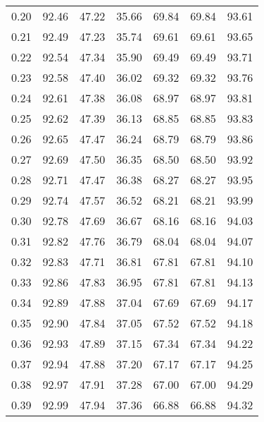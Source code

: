 \begin{tabular}{|c|c|c|c|c|c|c|}
      0.20 &     92.46 &     47.22 &      35.66 &   69.84 &      69.84 &         93.61 \\
      0.21 &     92.49 &     47.23 &      35.74 &   69.61 &      69.61 &         93.65 \\
      0.22 &     92.54 &     47.34 &      35.90 &   69.49 &      69.49 &         93.71 \\
      0.23 &     92.58 &     47.40 &      36.02 &   69.32 &      69.32 &         93.76 \\
      0.24 &     92.61 &     47.38 &      36.08 &   68.97 &      68.97 &         93.81 \\
      0.25 &     92.62 &     47.39 &      36.13 &   68.85 &      68.85 &         93.83 \\
      0.26 &     92.65 &     47.47 &      36.24 &   68.79 &      68.79 &         93.86 \\
      0.27 &     92.69 &     47.50 &      36.35 &   68.50 &      68.50 &         93.92 \\
      0.28 &     92.71 &     47.47 &      36.38 &   68.27 &      68.27 &         93.95 \\
      0.29 &     92.74 &     47.57 &      36.52 &   68.21 &      68.21 &         93.99 \\
      0.30 &     92.78 &     47.69 &      36.67 &   68.16 &      68.16 &         94.03 \\
      0.31 &     92.82 &     47.76 &      36.79 &   68.04 &      68.04 &         94.07 \\
      0.32 &     92.83 &     47.71 &      36.81 &   67.81 &      67.81 &         94.10 \\
      0.33 &     92.86 &     47.83 &      36.95 &   67.81 &      67.81 &         94.13 \\
      0.34 &     92.89 &     47.88 &      37.04 &   67.69 &      67.69 &         94.17 \\
      0.35 &     92.90 &     47.84 &      37.05 &   67.52 &      67.52 &         94.18 \\
      0.36 &     92.93 &     47.89 &      37.15 &   67.34 &      67.34 &         94.22 \\
      0.37 &     92.94 &     47.88 &      37.20 &   67.17 &      67.17 &         94.25 \\
      0.38 &     92.97 &     47.91 &      37.28 &   67.00 &      67.00 &         94.29 \\
      0.39 &     92.99 &     47.94 &      37.36 &   66.88 &      66.88 &         94.32 \\

\end{tabular}
